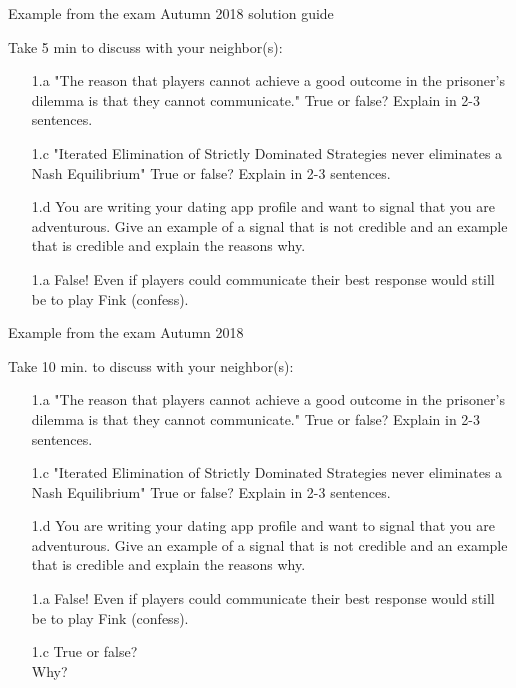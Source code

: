 \begin{frame}{Example from the exam Autumn 2018 solution guide}
\begin{multicols}{2}\color{lightgray}
  Take 5 min to discuss with your neighbor(s):
  \begin{itemize}
    \item[1.a] "The reason that players cannot achieve a good outcome in the prisoner’s dilemma is that they cannot communicate." True or false? Explain in 2-3 sentences.
    \color{lightgray}
    \item[\color{lightgray}1.c] "Iterated Elimination of Strictly Dominated Strategies never eliminates a Nash Equilibrium" True or false? Explain in 2-3 sentences.
    \item[\color{lightgray}1.d] You are writing your dating app profile and want to signal that you are adventurous. Give an example of a signal that is not credible and an example that is credible and explain the reasons why.
  \end{itemize}
\vfill\null
\columnbreak
\begin{itemize}
  \item[1.a] False! Even if players could communicate their best response would still be to play Fink (confess).
\end{itemize}
\end{multicols}
\end{frame}

\begin{frame}{Example from the exam Autumn 2018}
\begin{multicols}{2}\color{lightgray}
  Take 10 min. to discuss with your neighbor(s):
  \begin{itemize}\color{lightgray}
    \item[\color{lightgray}1.a] "The reason that players cannot achieve a good outcome in the prisoner’s dilemma is that they cannot communicate." True or false? Explain in 2-3 sentences.
    \item[1.c] \color{black}"Iterated Elimination of Strictly Dominated Strategies never eliminates a Nash Equilibrium" True or false? Explain in 2-3 sentences.
    \item[\color{lightgray}1.d] \color{lightgray}You are writing your dating app profile and want to signal that you are adventurous. Give an example of a signal that is not credible and an example that is credible and explain the reasons why.
  \end{itemize}
\vfill\null
\columnbreak
\begin{itemize}\color{lightgray}
  \item[\color{lightgray}1.a] False! Even if players could communicate their best response would still be to play Fink (confess).
  \item[1.c] \color{black} True or false? \\ Why?
\end{itemize}
\end{multicols}
\end{frame}

